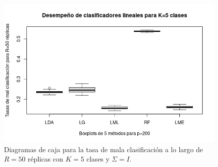 \documentclass{report}
\begin{document}
\begin{figure} [h]
\begin{multicols}{2}
  		\caption*{$p=100$}
  		\includegraphics[width=\linewidth]{5_clases_p200_sigma_I}\par 
  		\caption*{$p=200$}
  		
  	\end{multicols}
  	\caption{ Diagramas de caja para la tasa de mala clasificación  a lo largo de $R=50$ réplicas con $K=5$ clases y $\Sigma=I$. }
  	\label{boxk5sigmaiden}
  \end{figure}
  
\end{document}
